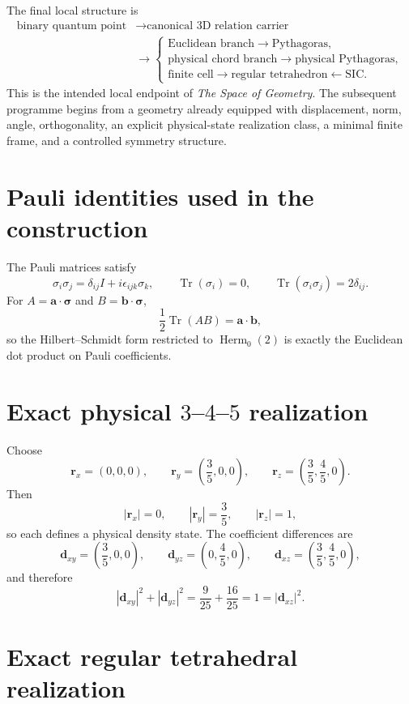 \documentclass[12pt,a4paper]{article}
\newcommand{\Herm}{\operatorname{Herm}}
\newcommand{\Tr}{\operatorname{Tr}}
\newcommand{\sigmavec}{\bm{\sigma}}
\newcommand{\rvec}{\bm{r}}
\newcommand{\dvec}{\bm{d}}
\begin{document}
The final local structure is
\[
\boxed{
\begin{aligned}
\text{binary quantum point}
&\longrightarrow \text{canonical 3D relation carrier}\\
&\longrightarrow
\begin{cases}
\text{Euclidean branch}\longrightarrow\text{Pythagoras},\\
\text{physical chord branch}\longrightarrow\text{physical Pythagoras},\\
\text{finite cell}\longrightarrow\text{regular tetrahedron}\longleftarrow\text{SIC}.
\end{cases}
\end{aligned}}
\]
This is the intended local endpoint of \emph{The Space of Geometry}. The subsequent programme begins from a geometry already equipped with displacement, norm, angle, orthogonality, an explicit physical-state realization class, a minimal finite frame, and a controlled symmetry structure.

\appendix
\section{Pauli identities used in the construction}

The Pauli matrices satisfy
\[
\sigma_i\sigma_j=\delta_{ij}I+i\epsilon_{ijk}\sigma_k,
\qquad
\Tr(\sigma_i)=0,
\qquad
\Tr(\sigma_i\sigma_j)=2\delta_{ij}.
\]
For $A=\bm a\cdot\sigmavec$ and $B=\bm b\cdot\sigmavec$,
\[
\frac12\Tr(AB)=\bm a\cdot\bm b,
\]
so the Hilbert--Schmidt form restricted to $\Herm_0(2)$ is exactly the Euclidean dot product on Pauli coefficients.

\section{Exact physical \texorpdfstring{$3$--$4$--$5$}{3--4--5} realization}

Choose
\[
\rvec_x=(0,0,0),
\qquad
\rvec_y=\left(\frac35,0,0\right),
\qquad
\rvec_z=\left(\frac35,\frac45,0\right).
\]
Then
\[
|\rvec_x|=0,
\qquad
|\rvec_y|=\frac35,
\qquad
|\rvec_z|=1,
\]
so each defines a physical density state. The coefficient differences are
\[
\dvec_{xy}=\left(\frac35,0,0\right),
\qquad
\dvec_{yz}=\left(0,\frac45,0\right),
\qquad
\dvec_{xz}=\left(\frac35,\frac45,0\right),
\]
and therefore
\[
\boxed{
|\dvec_{xy}|^2+|\dvec_{yz}|^2
=\frac9{25}+\frac{16}{25}
=1
=|\dvec_{xz}|^2.
}
\]

\section{Exact regular tetrahedral realization}
\end{document}
